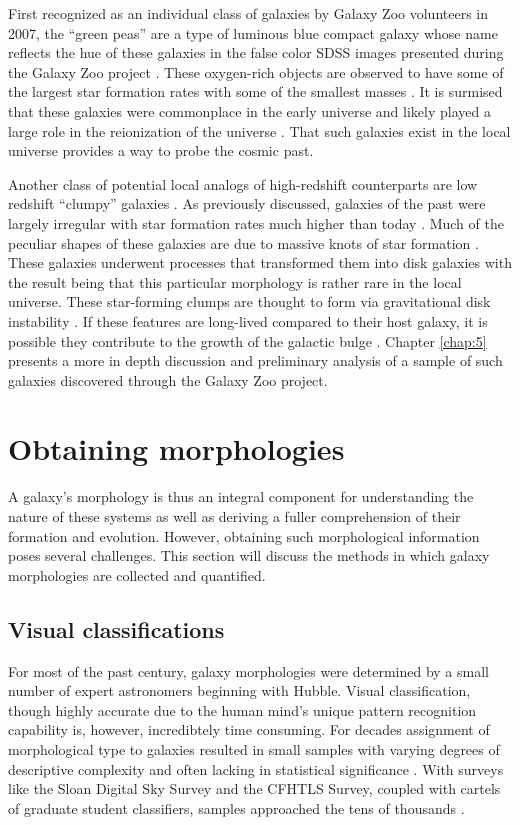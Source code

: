 First recognized as an individual class of galaxies by Galaxy Zoo volunteers in 2007, the ``green peas'' are a type of luminous blue compact galaxy whose name reflects the hue of these galaxies in the false color SDSS images presented during the Galaxy Zoo project \citep{Lintott2008,Cardamone2009}. These oxygen-rich objects are observed to have some of the largest star formation rates with some of the smallest masses \citep{Amorin2010}. It is surmised that these galaxies were commonplace in the early universe and likely played a large role in the reionization of the universe \citep{Izotov2016}. That such galaxies exist in the local universe provides a way to probe the cosmic past. 

Another class of potential local analogs of high-redshift counterparts are low redshift ``clumpy'' galaxies \citep{Elmegreen2005,Elmegreen2013}. As previously discussed, galaxies of the past were largely irregular with star formation rates much higher than today \citep{Madau2014}. Much of the peculiar shapes of these galaxies are due to massive knots of star formation \citep{Guo2015}. These galaxies underwent processes that transformed them into disk galaxies with the result being that this particular morphology is rather rare in the local universe. These star-forming clumps are thought to form via gravitational disk instability \citep{Toomre1964}. If these features are long-lived compared to their host galaxy, it is possible they contribute to the growth of the galactic bulge \citep{Conselice2014}. Chapter \ref{chap:5} presents a more in depth discussion and preliminary analysis of a sample of such galaxies discovered through the Galaxy Zoo project.


\section{Obtaining morphologies}
A galaxy's morphology is thus an integral component for understanding the nature of these systems as well as deriving a fuller comprehension of their formation and evolution. However, obtaining such morphological information poses several challenges. This section will discuss the methods in which galaxy morphologies are collected and quantified. 

\subsection{Visual classifications}
For most of the past century, galaxy morphologies were determined by a small number of expert astronomers beginning with Hubble. Visual classification, though highly accurate due to the human mind's unique pattern recognition capability is, however, incredibtely time consuming. For decades assignment of morphological type to galaxies resulted in small samples with varying degrees of descriptive complexity and often lacking in statistical significance \citep{Hubble1936, Sandage1961, SandageTammann1981, deVaucouleurs1963, deVaucouleurs1991}. With surveys like the Sloan Digital Sky Survey \citep[SDSS,][]{Abazajian2003} and the CFHTLS Survey, coupled with cartels of graduate student classifiers, samples approached the tens of thousands \citep{Fukugita2007, Schawinski2007, NairAbraham2010}.

